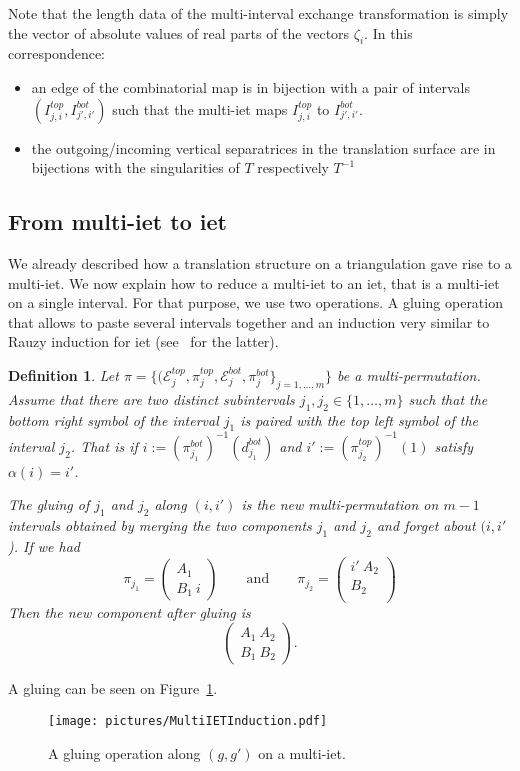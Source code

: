 \documentclass{article}
\def\cE{\mathcal{E}}
\newtheorem{definition}{Definition}
\begin{document}
Note that the length data of the multi-interval exchange transformation is
simply the vector of absolute values of real parts of the vectors $\zeta_i$.
In this correspondence:
\begin{itemize}
\item an edge of the combinatorial map is in bijection with a pair of intervals
$(I^{top}_{j,i}, I^{bot}_{j',i'})$ such that the multi-iet maps $I^{top}_{j,i}$
to $I^{bot}_{j',i'}$.
\item the outgoing/incoming vertical separatrices in the translation surface are
in bijections with the singularities of $T$ respectively $T^{-1}$
\end{itemize}

\subsection{From multi-iet to iet}
We already described how a translation structure on a triangulation gave rise to a
multi-iet. We now explain how to reduce a multi-iet to an iet, that is
a multi-iet on a single interval. For that purpose, we use two operations.
A gluing operation that allows to paste several
intervals together and an induction very similar to
Rauzy induction for iet (see~\cite{Yoccoz} for the latter).
\begin{definition}
Let
$\pi = \{(\cE^{top}_j, \pi^{top}_j, \cE^{bot}_j, \pi^{bot}_j\}_{j=1,\ldots,m}\}$
be a multi-permutation.
Assume that there are two distinct subintervals $j_1, j_2 \in \{1,\ldots,m\}$ such
that the bottom right symbol of the interval $j_1$ is paired with the top left
symbol of the interval $j_2$. That is if $i := (\pi^{bot}_{j_1})^{-1}(d_{j_1}^{bot})$
and $i' := (\pi^{top}_{j_2})^{-1}(1)$ satisfy $\alpha(i) = i'$.

The \emph{gluing of $j_1$ and $j_2$ along $(i, i')$} is the new multi-permutation
on $m-1$ intervals obtained by merging the two components $j_1$ and $j_2$ and forget
about $(i, i'$). If we had
\[
\pi_{j_1} = \left( \begin{array}{c}
A_1 \\
B_1\ i
\end{array} \right)
\qquad \text{and} \qquad
\pi_{j_2} = \left( \begin{array}{c}
i'\ A_2 \\
B_2 \\
\end{array} \right)
\]
Then the new component after gluing is
\[
\left( \begin{array}{c}
A_1\ A_2 \\
B_1\ B_2
\end{array} \right).
\]
\end{definition}
A gluing can be seen on Figure~\ref{fig:MIETGluing}.
\begin{figure}[!ht]
\begin{center}\texttt{[image: pictures/MultiIETInduction.pdf]}\end{center}
\caption{A gluing operation along $(g,g')$ on a multi-iet.}
\label{fig:MIETGluing}
\end{figure}
\end{document}

